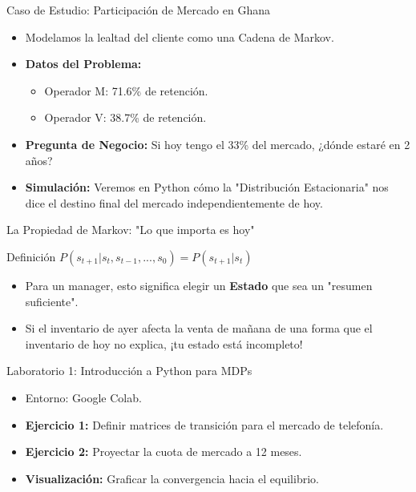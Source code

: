 \documentclass{beamer}
\begin{document}
\begin{frame}{Caso de Estudio: Participación de Mercado en Ghana}
\begin{itemize}
    \item Modelamos la lealtad del cliente como una Cadena de Markov.
    \item \textbf{Datos del Problema:}
    \begin{itemize}
        \item Operador M: 71.6\% de retención.
        \item Operador V: 38.7\% de retención.
    \end{itemize}
    \item \textbf{Pregunta de Negocio:} Si hoy tengo el 33\% del mercado, ¿dónde estaré en 2 años?
    \item \textbf{Simulación:} Veremos en Python cómo la "Distribución Estacionaria" nos dice el destino final del mercado independientemente de hoy.
\end{itemize}
\end{frame}

\begin{frame}{La Propiedad de Markov: "Lo que importa es hoy"}
\begin{block}{Definición}
$P(s_{t+1} | s_t, s_{t-1}, ..., s_0) = P(s_{t+1} | s_t)$
\end{block}
\begin{itemize}
    \item Para un manager, esto significa elegir un \textbf{Estado} que sea un "resumen suficiente".
    \item Si el inventario de ayer afecta la venta de mañana de una forma que el inventario de hoy no explica, ¡tu estado está incompleto!
\end{itemize}
\end{frame}

\begin{frame}{Laboratorio 1: Introducción a Python para MDPs}
\begin{itemize}
    \item Entorno: Google Colab.
    \item \textbf{Ejercicio 1:} Definir matrices de transición para el mercado de telefonía.
    \item \textbf{Ejercicio 2:} Proyectar la cuota de mercado a 12 meses.
    \item \textbf{Visualización:} Graficar la convergencia hacia el equilibrio.
\end{itemize}
\end{frame}
\end{document}
